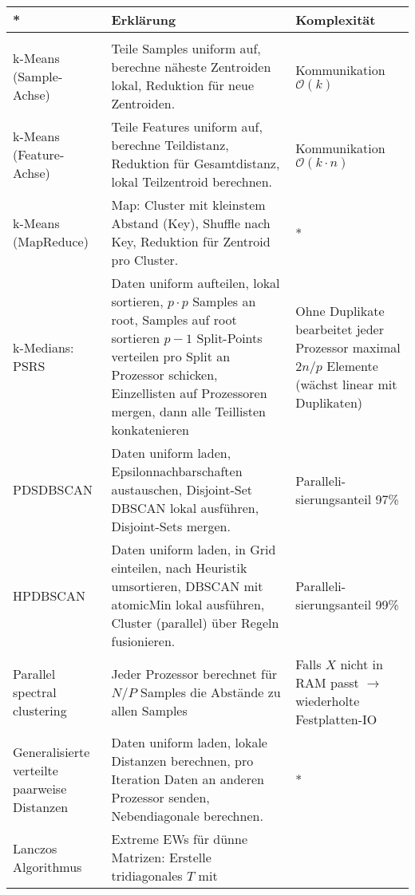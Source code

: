 \documentclass[11pt]{scrartcl}
\begin{document}
\begin{xltabular}{\linewidth}{p{25mm}|p{70mm}p{35mm}}
    * &
        Erklärung &
        Komplexität \\
    \hline
    & \vspace{-1em} & \\ \hline
    k-Means (Sample-Achse) & 
        Teile Samples uniform auf, berechne näheste Zentroiden lokal, Reduktion
        für neue Zentroiden. & 
        Kommunikation $\mathcal{O}(k)$ \\
    \hline
    k-Means (Feature-Achse) & 
        Teile Features uniform auf, berechne Teildistanz, Reduktion
        für Gesamtdistanz, lokal Teilzentroid berechnen. & 
        Kommunikation $\mathcal{O}(k \cdot n)$ \\
    \hline
    k-Means (MapReduce) & 
        Map: Cluster mit kleinstem Abstand (Key), Shuffle nach Key, Reduktion
        für Zentroid pro Cluster. & 
         *  \\
    \hline
    k-Medians: PSRS & 
        Daten uniform aufteilen, lokal sortieren, $p \cdot p$ Samples an 
        root, Samples auf root sortieren $p - 1$ Split-Points verteilen pro Split an
        Prozessor schicken, Einzellisten auf Prozessoren mergen, dann alle Teillisten
        konkatenieren & 
        Ohne Duplikate bearbeitet jeder Prozessor maximal $2n/p$ Elemente 
        (wächst linear mit Duplikaten)  \\
    \hline
    PDSDBSCAN & 
        Daten uniform laden, Epsilonnachbarschaften austauschen,
        Disjoint-Set DBSCAN lokal ausführen, Disjoint-Sets mergen. & 
        Paralleli-sierungsanteil 97\% \\
    \hline
    HPDBSCAN & 
        Daten uniform laden, in Grid einteilen, nach Heuristik umsortieren,
        DBSCAN mit atomicMin lokal ausführen, Cluster (parallel) über Regeln fusionieren. & 
        Paralleli-sierungsanteil 99\% \\
        \hline
    Parallel spectral clustering & 
        Jeder Prozessor berechnet für $N/P$ Samples die Abstände 
        zu allen Samples & 
        Falls $X$ nicht in RAM passt $\rightarrow$ wiederholte Festplatten-IO \\
        \hline
    Generalisierte verteilte paarweise Distanzen & 
        Daten uniform laden, lokale Distanzen berechnen, pro Iteration Daten
        an anderen Prozessor senden, Nebendiagonale berechnen. & 
         *  \\
        \hline
    Lanczos Algorithmus & 
        Extreme EWs für dünne Matrizen: Erstelle tridiagonales $T$  mit 

\end{xltabular}
\end{document}
